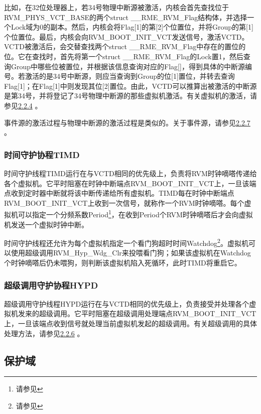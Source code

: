 比如，在32位处理器上，若34号物理中断源被激活，内核会首先查找位于RVM\_PHYS\_VCT\_BASE的两个struct
\_\_RME\_RVM\_Flag结构体，并选择一个Lock域为0的副本。然后，内核会将Flag{[}1{]}的第{[}2{]}个位置位，并将Group的第{[}1{]}个位置位。最后，内核会向RVM\_BOOT\_INIT\_VCT发送信号，激活VCTD。VCTD被激活后，会交替查找两个struct
\_\_RME\_RVM\_Flag中存在的置位的位。它在查找时，首先将第一个struct
\_\_RME\_RVM\_Flag的Lock置1，然后查询Group中哪些位被置位，并根据该信息查询对应的Flag{[}{]}，得到具体的中断源编号。若激活的是34号中断源，则应当查询到Group的位{[}1{]}置位，并转去查询Flag{[}1{]}；在Flag{[}1{]}中则发现其位{[}2{]}置位。由此，VCTD可以推算出被激活的中断源是第34号，并将登记了34号物理中断源的那些虚拟机激活。有关虚拟机的激活，请参见\protect\hyperref[subsec:2-2-4]{2.2.4}
。

事件源的激活过程与物理中断源的激活过程是类似的。关于事件源，请参见\protect\hyperref[subsec:2-2-7]{2.2.7}
。

\subsubsection{时间守护协程TIMD}\label{subsubsec:2-1-2-4}

时间守护线程TIMD运行在与VCTD相同的优先级上，负责将RVM时钟嘀嗒传递给各个虚拟机。它平时阻塞在时钟中断端点RVM\_BOOT\_INIT\_VCT上，一旦该端点收到定时器中断就将该中断传递给所有虚拟机。TIMD每在时钟中断端点RVM\_BOOT\_INIT\_VCT上收到一次信号，就称作一个RVM时钟嘀嗒。每个虚拟机可以指定一个分频系数Period\footnote{请参见}，在收到Period个RVM时钟嘀嗒后才会向虚拟机发送一个虚拟时钟中断。

时间守护线程还允许为每个虚拟机指定一个看门狗超时时间Watchdog\footnote{请参见}。虚拟机可以使用超级调用RVM\_Hyp\_Wdg\_Clr来投喂看门狗；如果该虚拟机在Watchdog个时钟嘀嗒后仍未喂狗，则判断该虚拟机陷入死循环，此时TIMD将重启它。

\subsubsection{超级调用守护协程HYPD}\label{subsubsec:2-1-2-5}

超级调用守护线程HYPD运行在与VCTD相同的优先级上，负责接受并处理各个虚拟机发来的超级调用。它平时阻塞在超级调用处理端点RVM\_BOOT\_INIT\_VCT上，一旦该端点收到信号就处理当前虚拟机发起的超级调用。有关超级调用的具体处理方法，请参见\protect\hyperref[subsec:2-2-6]{2.2.6}
。

\subsection{保护域}\label{subsec:2-1-3}

